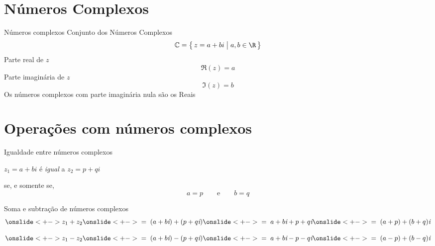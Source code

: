 \documentclass[fleqn,utf8,aspectratio=169,12pt]{beamer}
\begin{document}


\section{Números Complexos}

\begin{frame}{Números complexos}
  Conjunto dos Números Complexos
  \[
    \mathbb{C} = \big\{\, z=a+bi \;\big|\; a, b \in \R \,\big\}
  \]
  \pause
  Parte real de $z$
  \[
    \Re(z) = a
  \]
  \pause
  Parte imaginária de $z$
  \[
    \Im(z) = b
  \]
  \pause
  Os números complexos com parte imaginária nula são os Reais
\end{frame}

\section{Operações com números complexos}

\begin{frame}{Igualdade entre números complexos}

  \( z_1 = a + bi \) \; é \emph{igual} a \;
  \( z_2 = p + qi \)

  \pause
  \bigskip
  se, e somente se,
  \[
     a = p
     \qquad\text{e}\qquad
     b = q
  \]
\end{frame}

\begin{frame}{Soma e subtração de números complexos}
  \[
    \onslide<+->{z_1 + z_2}
    \onslide<+->{\;=\; (a+b\emph{i}) + (p+q\emph{i})}
    \onslide<+->{\;=\; a + b\emph{i} + p + q\emph{i}}
    \onslide<+->{\;=\; (a+p) + (b+q) \emph{i}}
  \]

  \[
    \onslide<+->{z_1 - z_2}
    \onslide<+->{\;=\; (a+b\emph{i}) - (p+q\emph{i})}
    \onslide<+->{\;=\; a+b\emph{i} -p -q\emph{i}}
    \onslide<+->{\;=\; (a-p) + (b-q) \emph{i}}
  \]
\end{frame}
\end{document}
